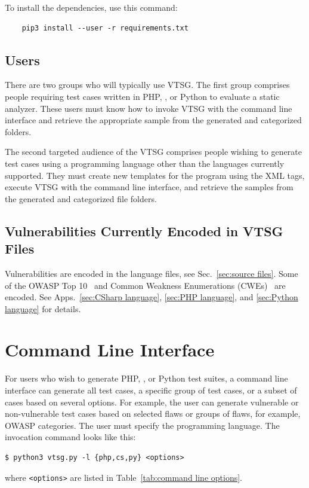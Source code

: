 \noindent To install the dependencies, use this command:

\begin{verbatim}
    pip3 install --user -r requirements.txt
\end{verbatim}


\subsection{Users}

There are two groups who will typically use VTSG. The first group comprises people
requiring test cases written in PHP, \CSharp, or Python to evaluate a static
analyzer. These users must know how to invoke VTSG with the command line interface
and retrieve the appropriate sample from the generated and categorized folders.

The second targeted audience of the VTSG comprises people wishing to generate
test cases using a programming language other than the languages currently
supported.  They must create new templates for the program
using the XML tags, execute VTSG with the command line interface,
and retrieve the samples from the generated and categorized file folders.

\subsection{Vulnerabilities Currently Encoded in VTSG Files}

Vulnerabilities are encoded in the language files, see Sec.~\ref{sec:source files}.
Some of the OWASP Top 10~\cite{OWASPTop10-2017} and
Common Weakness Enumerations (CWEs)~\cite{CWE} are encoded.
See Apps.~\ref{sec:CSharp language}, \ref{sec:PHP language}, and
\ref{sec:Python language} for details.


\section{Command Line Interface}
\label{sec:command line interface}

For users who wish to generate PHP, \CSharp, or Python test suites, a command line
interface
can generate all test cases, a specific group of test cases, or a subset of
cases based on several
options.  For example, the user can generate vulnerable or non-vulnerable test cases
based on selected flaws or groups of flaws, for example, OWASP categories.
The user must specify the
programming language.  The invocation command looks like this:
\begin{verbatim}
$ python3 vtsg.py -l {php,cs,py} <options>
\end{verbatim}
\newcommand{\texlangle}{$\langle$}
\newcommand{\texrangle}{$\rangle$}
where \verb|<options>| are listed in
Table~\ref{tab:command line options}.

